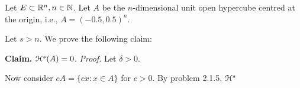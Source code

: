 Let \(E \subset \mathbb{R}^n, n \in \mathbb{N}\). Let \(A\) be the \(n\)-dimensional unit open hypercube centred at the origin, i.e., \(A = (-0.5, 0.5)^n\).

Let \(s > n\). We prove the following claim:

\textbf{Claim.} \(\mathcal{H}^s(A) = 0\).
\textit{Proof.} Let \(\delta > 0.\)

Now consider \(cA = \{cx : x \in A\}\) for \(c > 0\). By problem 2.1.5, \(\mathcal{H}^s\)